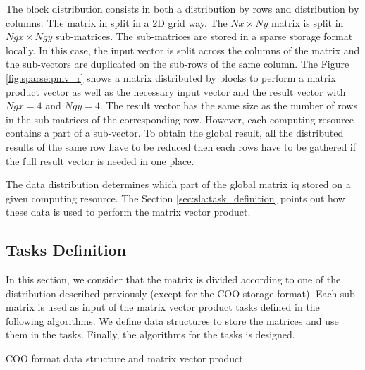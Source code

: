 The block distribution consists in both a distribution by rows and distribution by columns.
The matrix in split in a 2D grid way.
The $Nx \times Ny$ matrix is split in $Ngx \times Ngy$ sub-matrices.
The sub-matrices are stored in a sparse storage format locally.
In this case, the input vector is split across the columns of the matrix and the sub-vectors are duplicated on the sub-rows of the same column.
The Figure \ref{fig:sparse:pmv_r} shows a matrix distributed by blocks to perform a matrix product vector as well as the necessary input vector and the result vector with $Ngx = 4$ and $Ngy = 4$.
The result vector has the same size as the number of rows in the sub-matrices of the corresponding row.
However, each computing resource contains a part of a sub-vector.
To obtain the global result, all the distributed results of the same row have to be reduced then each rows have to be gathered if the full result vector is needed in one place.

The data distribution determines which part of the global matrix iq stored on a given computing resource.
The Section \ref{sec:sla:task_definition} points out how these data is used to perform the matrix vector product.

\subsection{Tasks Definition \label{sec:sla:task_definition}}

In this section, we consider that the matrix is divided according to one of the distribution described previously (except for the COO storage format).
Each sub-matrix is used as input of the matrix vector product tasks defined in the following algorithms.
We define data structures to store the matrices and use them in the tasks.
Finally, the algorithms for the tasks is designed.


\begin{algorithm}[h]
	\DontPrintSemicolon
	\SetAlgoVlined
	\caption{COO format data structure and matrix vector product\label{alg:sparse:spmv_coo}}

	\;
\end{algorithm}

